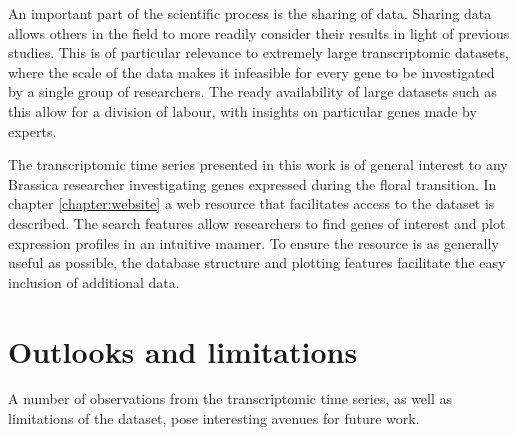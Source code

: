 \documentclass[12pt,]{book}
\begin{document}
An important part of the scientific process is the sharing of data.
Sharing data allows others in the field to more readily consider their
results in light of previous studies. This is of particular relevance to
extremely large transcriptomic datasets, where the scale of the data
makes it infeasible for every gene to be investigated by a single group
of researchers. The ready availability of large datasets such as this
allow for a division of labour, with insights on particular genes made
by experts.

The transcriptomic time series presented in this work is of general
interest to any Brassica researcher investigating genes expressed during
the floral transition. In chapter \ref{chapter:website} a web resource
that facilitates access to the dataset is described. The search features
allow researchers to find genes of interest and plot expression profiles
in an intuitive manner. To ensure the resource is as generally useful as
possible, the database structure and plotting features facilitate the
easy inclusion of additional data.

\section{Outlooks and limitations}\label{outlooks-and-limitations}

A number of observations from the transcriptomic time series, as well as
limitations of the dataset, pose interesting avenues for future work.
\end{document}
